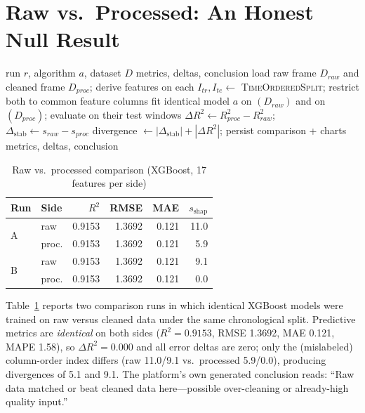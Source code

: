 \documentclass[conference]{IEEEtran}
\begin{document}
\section{Raw vs.\ Processed: An Honest Null Result}\label{sec:rawproc}

\begin{algorithm}[!t]
\caption{RawVsProcessedComparison}
\label{alg:cmp}
\begin{algorithmic}[1]
\REQUIRE run $r$, algorithm $a$, dataset $D$
\ENSURE metrics, deltas, conclusion
\STATE load raw frame $D_{raw}$ and cleaned frame $D_{proc}$; derive features on each
\STATE $I_{tr}, I_{te} \gets$ \textsc{TimeOrderedSplit}; \quad restrict both to common feature columns
\STATE fit identical model $a$ on $(D_{raw})$ and on $(D_{proc})$; evaluate on their test windows
\STATE $\Delta R^2 \gets R^2_{proc} - R^2_{raw}$; \quad $\Delta_{\text{stab}} \gets s_{raw} - s_{proc}$
\STATE divergence $\gets |\Delta_{\text{stab}}| + |\Delta R^2|$; \quad persist comparison + charts
\RETURN metrics, deltas, conclusion
\end{algorithmic}
\end{algorithm}

\begin{table}[!t]
\caption{Raw vs.\ processed comparison (XGBoost, 17 features per side)}
\label{tab:rawproc}
\centering
\begin{tabular}{@{}llrrrr@{}}
\toprule
Run & Side & $R^2$ & RMSE & MAE & $s_{\text{shap}}$ \\
\midrule
\multirow{2}{*}{A} & raw & 0.9153 & 1.3692 & 0.121 & 11.0 \\
 & proc. & 0.9153 & 1.3692 & 0.121 & 5.9 \\
\midrule
\multirow{2}{*}{B} & raw & 0.9153 & 1.3692 & 0.121 & 9.1 \\
 & proc. & 0.9153 & 1.3692 & 0.121 & 0.0 \\
\bottomrule
\end{tabular}
\end{table}

Table~\ref{tab:rawproc} reports two comparison runs in which identical XGBoost models were trained on raw versus cleaned data under the same chronological split. Predictive metrics are \emph{identical} on both sides ($R^2=0.9153$, RMSE 1.3692, MAE 0.121, MAPE 1.58), so $\Delta R^2 = 0.000$ and all error deltas are zero; only the (mislabeled) column-order index differs (raw 11.0/9.1 vs.\ processed 5.9/0.0), producing divergences of 5.1 and 9.1. The platform's own generated conclusion reads: ``Raw data matched or beat cleaned data here---possible over-cleaning or already-high quality input.''
\end{document}
